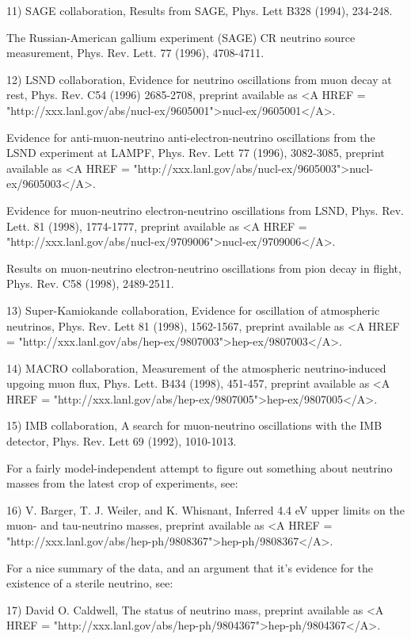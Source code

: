 11) SAGE collaboration, Results from SAGE, Phys. Lett B328 (1994), 
234-248.

The Russian-American gallium experiment (SAGE) CR neutrino source
measurement, Phys. Rev. Lett. 77 (1996), 4708-4711. 

12) LSND collaboration, Evidence for neutrino oscillations from 
muon decay at rest, Phys. Rev. C54 (1996) 2685-2708, preprint available
as <A HREF = "http://xxx.lanl.gov/abs/nucl-ex/9605001">nucl-ex/9605001</A>.

Evidence for anti-muon-neutrino \to  anti-electron-neutrino oscillations
from the LSND experiment at LAMPF, Phys. Rev. Lett 77 (1996), 3082-3085,
preprint available as 
<A HREF = "http://xxx.lanl.gov/abs/nucl-ex/9605003">nucl-ex/9605003</A>.

Evidence for muon-neutrino \to  electron-neutrino 
oscillations from LSND, Phys. Rev. Lett. 81 
(1998), 1774-1777, preprint available as
<A HREF = "http://xxx.lanl.gov/abs/nucl-ex/9709006">nucl-ex/9709006</A>.

Results on muon-neutrino \to  electron-neutrino
oscillations from pion decay in flight,
Phys. Rev. C58 (1998), 2489-2511.

13) Super-Kamiokande collaboration, Evidence for oscillation of 
atmospheric neutrinos, Phys. Rev. Lett 81 (1998), 1562-1567,
preprint available as
<A HREF = "http://xxx.lanl.gov/abs/hep-ex/9807003">hep-ex/9807003</A>.

14) MACRO collaboration, Measurement of the atmospheric neutrino-induced
upgoing muon flux, Phys. Lett. B434 (1998), 451-457, 
preprint available as
<A HREF = "http://xxx.lanl.gov/abs/hep-ex/9807005">hep-ex/9807005</A>.

15) IMB collaboration, A search for muon-neutrino oscillations with
the IMB detector, Phys. Rev. Lett 69 (1992), 1010-1013.

For a fairly model-independent attempt to figure out something about
neutrino masses from the latest crop of experiments, see:

16) V. Barger, T. J. Weiler, and K. Whisnant, Inferred 4.4 eV upper
limits on the muon- and tau-neutrino masses, preprint available as
<A HREF = "http://xxx.lanl.gov/abs/hep-ph/9808367">hep-ph/9808367</A>.

For a nice summary of the data, and an argument that it's evidence
for the existence of a sterile neutrino, see:

17) David O. Caldwell, The status of neutrino mass, preprint available
as 
<A HREF = "http://xxx.lanl.gov/abs/hep-ph/9804367">hep-ph/9804367</A>.

